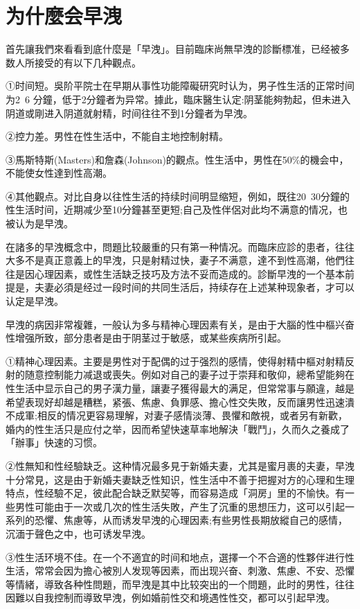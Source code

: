 \documentclass[12pt,UTF8]{ctexbook}
\begin{document}
\section{为什麼会早洩}

首先讓我們來看看到底什麼是「早洩」。目前臨床尚無早洩的診斷標准，已经被多数人所接受的有以下几种觀点。

①时间短。吳阶平院士在早期从事性功能障礙研究时认为，男子性生活的正常时间为2~6 分鐘，低于2分鐘者为异常。據此，臨床醫生认定:阴茎能夠勃起，但未进入阴道或剛进入阴道就射精，时间往往不到1分鐘者为早洩。

②控力差。男性在性生活中，不能自主地控制射精。

③馬斯特斯(Masters)和詹森(Johnson)的觀点。性生活中，男性在50\%的機会中，不能使女性達到性高潮。

④其他觀点。对比自身以往性生活的持续时间明显缩短，例如，既往20~30分鐘的性生活时间，近期减少至10分鐘甚至更短;自己及性伴侶对此均不满意的情况，也被认为是早洩。

在諸多的早洩概念中，問題比较嚴重的只有第一种情况。而臨床应診的患者，往往大多不是真正意義上的早洩，只是射精过快，妻子不满意，達不到性高潮，他們往往是因心理因素，或性生活缺乏技巧及方法不妥而造成的。診斷早洩的一个基本前提是，夫妻必須是经过一段时间的共同生活后，持续存在上述某种现象者，才可以认定是早洩。

早洩的病因非常複雜，一般认为多与精神心理因素有关，是由于大腦的性中樞兴奋性增强所致，部分患者是由于阴茎过于敏感，或某些疾病所引起。

①精神心理因素。主要是男性对于配偶的过于强烈的感情，使得射精中樞对射精反射的随意控制能力减退或喪失。例如对自己的妻子过于崇拜和敬仰，總希望能夠在性生活中显示自己的男子漢力量，讓妻子獲得最大的满足，但常常事与願違，越是希望表现好却越是糟糕，紧張、焦慮、負罪感、擔心性交失敗，反而讓男性迅速潰不成軍;相反的情况更容易理解，对妻子感情淡薄、畏懼和敵視，或者另有新歡，婚内的性生活只是应付之举，因而希望快速草率地解決「戰鬥」，久而久之養成了「辦事」快速的习惯。

②性無知和性经驗缺乏。这种情况最多見于新婚夫妻，尤其是蜜月裹的夫妻，早洩十分常見，这是由于新婚夫妻缺乏性知识，性生活中不善于把握对方的心理和生理特点，性经驗不足，彼此配合缺乏默契等，而容易造成「洞房」里的不愉快。有一些男性可能由于一次或几次的性生活失敗，产生了沉重的思想压力，这可以引起一系列的恐懼、焦慮等，从而诱发早洩的心理因素;有些男性長期放縱自己的感情，沉湎于聲色之中，也可诱发早洩。

③性生活环境不佳。在一个不適宜的时间和地点，選擇一个不合適的性夥伴进行性生活，常常会因为擔心被別人发现等因素，而出现兴奋、刺激、焦慮、不安、恐懼等情緒，導致各种性問題，而早洩是其中比较突出的一个問題，此时的男性，往往因難以自我控制而導致早洩，例如婚前性交和境遇性性交，都可以引起早洩。
\end{document}
